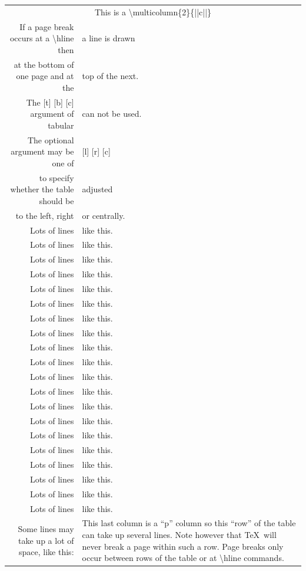 \documentclass{ctexart}
\begin{document}
\begin{longtable}{@{*}r||p{1in}@{*}}
            \multicolumn{2}{||c||}{This is a \textsf{\textbackslash{}multicolumn\{2\}\{||c||\}}}\\
            If a page break occurs at a \textsf{\textbackslash{}hline} then&a line is drawn\\
            at the bottom of one page and at the&top of the next.\\
            \hline
            The \textsf{[t] [b] [c]} argument of \textsf{tabular}&can not be used.\\
            The optional argument may be one of&\textsf{[l] [r] [c]}\\
            to specify whether the table should be&adjusted\\
            to the left, right&or centrally.\\
            \hline\hline
                Lots of lines&like this.\\
                Lots of lines&like this.\\
                Lots of lines&like this.\\
                Lots of lines&like this.\\
                Lots of lines&like this.\\
                Lots of lines&like this.\\
                Lots of lines&like this.\\
                Lots of lines&like this.\\
                Lots of lines&like this.\\
                Lots of lines&like this.\\
                Lots of lines&like this.\\
                Lots of lines&like this.\\
                Lots of lines&like this.\\
                Lots of lines&like this.\\
                Lots of lines&like this.\\
                Lots of lines&like this.\\
                Lots of lines&like this.\\
                Lots of lines&like this.\\
                Lots of lines&like this.\\
                Lots of lines&like this.\\
                Some lines may take up a lot of space, like this:&This last column is a ``p'' column so this ``row'' of the table can take up several lines. Note however that \TeX\ will never break a page within such a row. Page breaks only occur between rows of the table or at \textsf{\textbackslash{}hline} commands.\\

\end{longtable}
\end{document}
